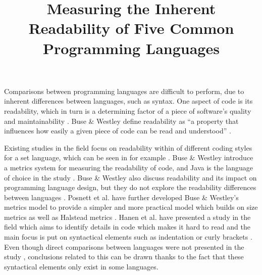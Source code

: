 \documentclass[times, 10pt,twocolumn]{IEEEtran}
\begin{document}
\title{Measuring the Inherent Readability of Five Common Programming Languages}

\author{


}
\maketitle
\thispagestyle{empty}


Comparisons between programming languages are difficult to perform, due to inherent differences between languages, such as syntax. One aspect of code is its readability, which in turn is a determining factor of a piece of software's quality and maintainability \cite{aggarwal2002integrated, elshoff1982improving}. Buse \& Westley define readability as ``a property that influences how easily a given piece of code can be read and understood'' \cite{buse2010learning}. 
\newline

Existing studies in the field focus on readability within of different coding styles for a set language, which can be seen in for example \cite{buse2010learning}. Buse \& Westley introduce a metrics system for measuring the readability of code, and Java is the language of choice in the study \cite{buse2010learning}. Buse \& Westley also discuss readability and its impact on programming language design, but they do not explore the readability differences between languages \cite{buse2010learning}. Posnett et al. \cite{posnett2011simpler} have further developed Buse \& Westley's metrics model to provide a simpler and more practical model which builds on size metrics as well as Halstead metrics \cite{halstead1977elements}. Hanen et al. have presented a study in the field which aims to identify details in code which makes it hard to read and the main focus is put on syntactical elements such as indentation or curly brackets \cite{hansen2013makes}. Even though direct comparisons between languages were not presented in the study \cite{hansen2013makes}, conclusions related to this can be drawn thanks to the fact that these syntactical elements only exist in some languages. 
\newline
\end{document}

